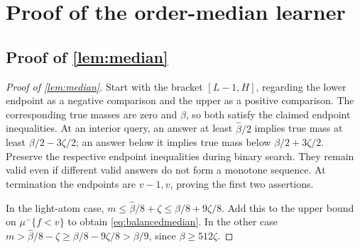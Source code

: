 \section{Proof of the order-median learner}\label{app:proofs-C}

\subsection[Proof of result median]{Proof of \cref{lem:median}}\label{proof:median}
\begin{proof}[Proof of \cref{lem:median}]
Start with the bracket $[L-1,H]$, regarding the lower endpoint as a negative comparison and the upper as a positive comparison. The corresponding true masses are zero and $\beta$, so both satisfy the claimed endpoint inequalities. At an interior query, an answer at least $\widehat\beta/2$ implies true mass at least $\beta/2-3\zeta/2$; an answer below it implies true mass below $\beta/2+3\zeta/2$. Preserve the respective endpoint inequalities during binary search. They remain valid even if different valid answers do not form a monotone sequence. At termination the endpoints are $v-1,v$, proving the first two assertions.

In the light-atom case, $m\le\widehat\beta/8+\zeta\le\beta/8+9\zeta/8$. Add this to the upper bound on $\mu^-\{f<v\}$ to obtain \eqref{eq:balancedmedian}. In the other case $m>\widehat\beta/8-\zeta\ge\beta/8-9\zeta/8>\beta/9$, since $\beta\ge512\zeta$.
\end{proof}

